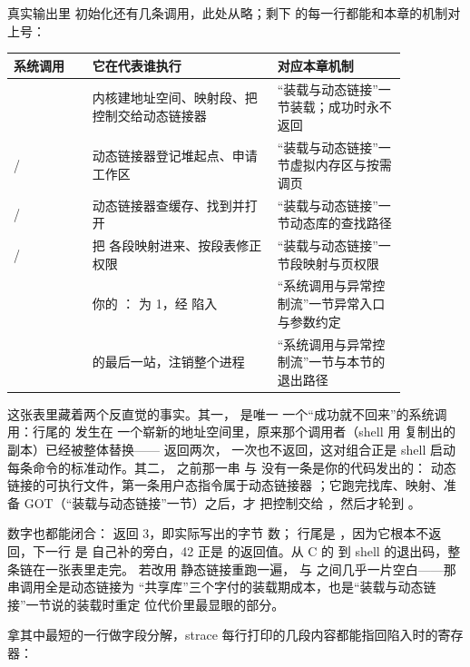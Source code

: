 真实输出里  初始化还有几条调用，此处从略；剩下
的每一行都能和本章的机制对上号：

\begin{longtable}{L{0.17\linewidth}L{0.4\linewidth}L{0.29\linewidth}}
\toprule
系统调用 & 它在代表谁执行 & 对应本章机制 \\
\midrule
{} & 内核建地址空间、映射段、把控制交给动态链接器 &“装载与动态链接”一节装载；成功时永不返回 \\\tablerowrule
{}/ & 动态链接器登记堆起点、申请工作区 &“装载与动态链接”一节虚拟内存区与按需调页 \\\tablerowrule
{}/ & 动态链接器查缓存、找到并打开  &“装载与动态链接”一节动态库的查找路径 \\\tablerowrule
{}/ & 把  各段映射进来、按段表修正权限 &“装载与动态链接”一节段映射与页权限 \\\tablerowrule
{} & 你的 ： 为 1，经  陷入 &“系统调用与异常控制流”一节异常入口与参数约定 \\\tablerowrule
{} &  的最后一站，注销整个进程 &“系统调用与异常控制流”一节与本节的退出路径 \\
\bottomrule
\end{longtable}

这张表里藏着两个反直觉的事实。其一， 是唯一
一个“成功就不回来”的系统调用：行尾的  发生在
一个崭新的地址空间里，原来那个调用者（shell 用
 复制出的副本）已经被整体替换——
返回两次， 一次也不返回，这对组合正是 shell
启动每条命令的标准动作。其二， 之前那一串
 与  没有一条是你的代码发出的：
动态链接的可执行文件，第一条用户态指令属于动态链接器
；它跑完找库、映射、准备 GOT（“装载与动态链接”一节）之后，才
把控制交给 ，然后才轮到 。

数字也都能闭合： 返回 3，即实际写出的字节
数； 行尾是 ，因为它根本不返
回，下一行  是 
自己补的旁白，42 正是  的返回值。从 C 的
 到 shell 的退出码，整条链在一张表里走完。
若改用  静态链接重跑一遍， 与
 之间几乎一片空白——那串调用全是动态链接为
“共享库”三个字付的装载期成本，也是“装载与动态链接”一节说的装载时重定
位代价里最显眼的部分。

拿其中最短的一行做字段分解，strace 每行打印的几段内容都能指回陷入时的寄存器：


